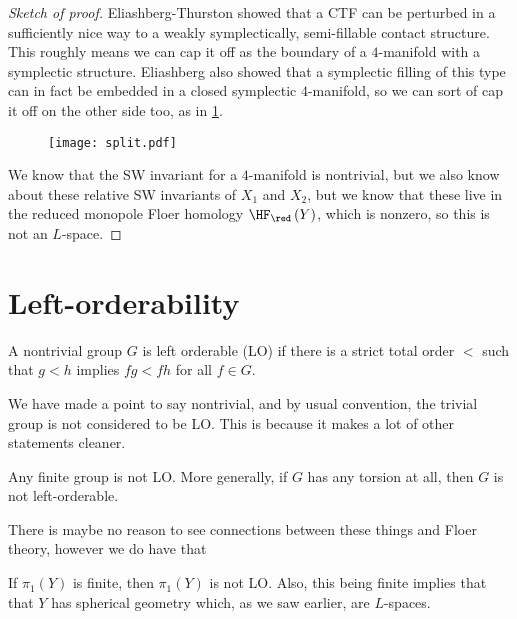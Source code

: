 \documentclass{amsart}
\begin{document}
\begin{proof}[Sketch of proof]
Eliashberg-Thurston showed that a CTF can be perturbed in a sufficiently nice way
to a weakly symplectically, semi-fillable
contact structure.
This roughly means we can cap it off
as the boundary of a $4$-manifold with a symplectic structure.
Eliashberg also showed that a symplectic filling of this type can in fact be embedded 
in a closed symplectic $4$-manifold,
so we can sort of cap it off on the other side too, as in \cref{fig:split}.
\begin{figure}
\texttt{[image: split.pdf]}
\label{fig:split}
\end{figure}
We know that the SW invariant for a $4$-manifold is nontrivial, but we also know about these
relative SW invariants of $X_1$ and $X_2$, but we know that these live in the 
reduced monopole Floer homology
$\HF_\red\left( Y \right)$, which is nonzero, so this is not an $L$-space.
\end{proof}

\section{Left-orderability}

\begin{defn}
A nontrivial group $G$ is left orderable (LO) if
there is a strict total order $<$ such that $g < h$ 
implies $fg < fh$ for all $f\in G$.
\end{defn}

\begin{wrn}
We have made a point to say nontrivial, and by usual convention, 
the trivial group is not considered to be LO.
This is because it makes a lot of other statements cleaner.
\end{wrn}

\begin{exm}
Any finite group is not LO.
More generally, if $G$ has any torsion at all, then $G$ 
is not left-orderable.
\end{exm}

There is maybe no reason to see connections between these things and Floer theory, 
however we do have that

\begin{prop}
If $\pi_1\left( Y \right)$ is finite, then $\pi_1\left( Y \right)$ is not LO.
Also, this being finite implies that that
$Y$ has spherical geometry which, as we saw earlier, are $L$-spaces.
\end{prop}
\end{document}
